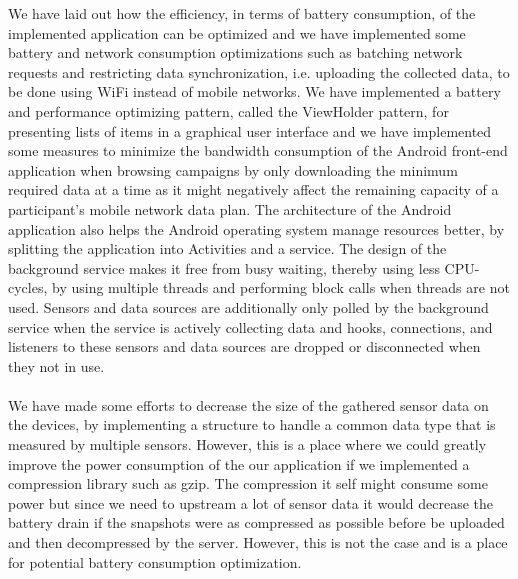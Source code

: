 We have laid out how the efficiency, in terms of battery consumption, of the implemented application can be optimized and we have implemented some battery and network consumption optimizations such as batching network requests and restricting data synchronization, i.e. uploading the collected data, to be done using WiFi instead of mobile networks. We have implemented a battery and performance optimizing pattern, called the ViewHolder pattern, for presenting lists of items in a graphical user interface and we have implemented some measures to minimize the bandwidth consumption of the Android front-end application when browsing campaigns by only downloading the minimum required data at a time as it might negatively affect the remaining capacity of a participant's mobile network data plan. The architecture of the Android application also helps the Android operating system manage resources better, by splitting the application into Activities and a service. The design of the background service makes it free from busy waiting, thereby using less CPU-cycles, by using multiple threads and performing block calls when threads are not used. Sensors and data sources are additionally only polled by the background service when the service is actively collecting data and hooks, connections, and listeners to these sensors and data sources are dropped or disconnected when they not in use. 
\\\\
We have made some efforts to decrease the size of the gathered sensor data on the devices, by implementing a structure to handle a common data type that is measured by multiple sensors. However, this is a place where we could greatly improve the power consumption of the our application if we implemented a compression library such as gzip. The compression it self might consume some power but since we need to upstream a lot of sensor data it would decrease the battery drain if the snapshots were as compressed as possible before be uploaded and then decompressed by the server. However, this is not the case and is a place for potential battery consumption optimization.


